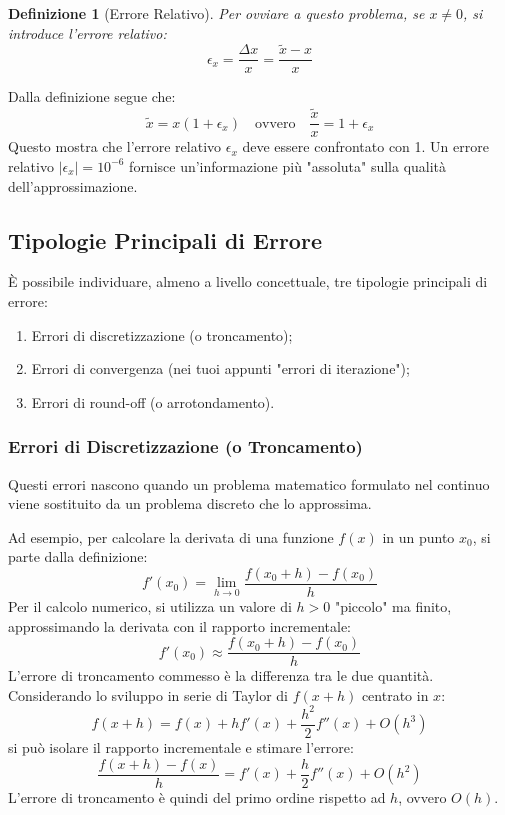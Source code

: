 \documentclass{article}
\newtheorem{definition}{Definizione}[section]
\begin{document}
\begin{definition}[Errore Relativo]
Per ovviare a questo problema, se $x \neq 0$, si introduce l'errore relativo:
$$ \epsilon_x = \frac{\Delta x}{x} = \frac{\tilde{x} - x}{x} $$
\end{definition}

Dalla definizione segue che:
$$ \tilde{x} = x(1 + \epsilon_x) \quad \text{ovvero} \quad \frac{\tilde{x}}{x} = 1 + \epsilon_x $$
Questo mostra che l'errore relativo $\epsilon_x$ deve essere confrontato con 1. Un errore relativo $|\epsilon_x|=10^{-6}$ fornisce un'informazione più "assoluta" sulla qualità dell'approssimazione.

\subsection{Tipologie Principali di Errore}
È possibile individuare, almeno a livello concettuale, tre tipologie principali di errore:
\begin{enumerate}
    \item Errori di discretizzazione (o troncamento);
    \item Errori di convergenza (nei tuoi appunti "errori di iterazione");
    \item Errori di round-off (o arrotondamento).
\end{enumerate}

\subsubsection{Errori di Discretizzazione (o Troncamento)}
Questi errori nascono quando un problema matematico formulato nel continuo viene sostituito da un problema discreto che lo approssima.

Ad esempio, per calcolare la derivata di una funzione $f(x)$ in un punto $x_0$, si parte dalla definizione:
$$ f'(x_0) = \lim_{h \to 0} \frac{f(x_0+h) - f(x_0)}{h} $$
Per il calcolo numerico, si utilizza un valore di $h>0$ "piccolo" ma finito, approssimando la derivata con il rapporto incrementale:
$$ f'(x_0) \approx \frac{f(x_0+h) - f(x_0)}{h} $$
L'errore di troncamento commesso è la differenza tra le due quantità.
Considerando lo sviluppo in serie di Taylor di $f(x+h)$ centrato in $x$:
$$ f(x+h) = f(x) + h f'(x) + \frac{h^2}{2} f''(x) + O(h^3) $$
si può isolare il rapporto incrementale e stimare l'errore:
$$ \frac{f(x+h) - f(x)}{h} = f'(x) + \frac{h}{2}f''(x) + O(h^2) $$
L'errore di troncamento è quindi del primo ordine rispetto ad $h$, ovvero $O(h)$.
\end{document}
